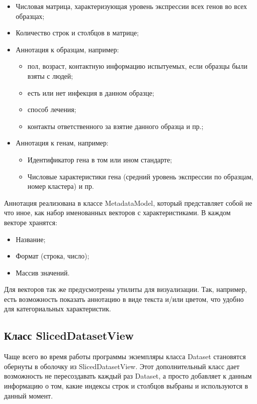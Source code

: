 \documentclass[specification,annotation]{itmo-student-thesis}
\begin{document}
\begin{itemize}
\item Числовая матрица, характеризующая уровень экспрессии всех генов во всех образцах;
\item Количество строк и столбцов в матрице;
\item Аннотация к образцам, например:\begin{itemize}
    \item пол, возраст, контактную информацию испытуемых, если образцы были взяты с людей;
    \item есть или нет инфекция в данном образце;
    \item способ лечения;
    \item контакты ответственного за взятие данного образца и пр.;\end{itemize}
\item Аннотация к генам, например:\begin{itemize}
    \item Идентификатор гена в том или ином стандарте;
    \item Числовые характеристики гена (средний уровень экспрессии по образцам, номер кластера) и пр.\end{itemize}
\end{itemize}

Аннотация реализована в классе MetadataModel, который представляет собой не что иное, как набор именованных векторов с характеристиками. В каждом векторе хранятся:

\begin{itemize}
\item Название;
\item Формат (строка, число);
\item Массив значений.
\end{itemize}

Для векторов так же предусмотрены утилиты для визуализации. Так, например, есть возможность показать аннотацию в виде текста и/или цветом, что удобно для категориальных характеристик. 

\subsection{Класс SlicedDatasetView}
Чаще всего во время работы программы экземпляры класса Dataset становятся обернуты в оболочку из SlicedDatasetView. Этот дополнительный класс дает возможность не пересоздавать каждый раз Dataset, а просто добавляет к данным информацию о том, какие индексы строк и столбцов выбраны и используются в данный момент.
\end{document}
